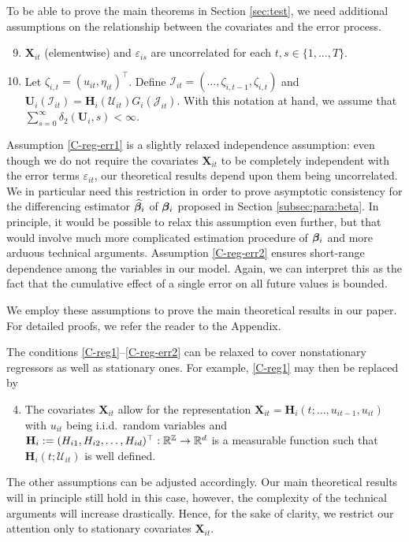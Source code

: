 \documentclass[a4paper,12pt]{article}
\begin{document}
To be able to prove the main theorems in Section \ref{sec:test}, we need additional assumptions on the relationship between the covariates and the error process.

\begin{enumerate}[label=(C\arabic*),leftmargin=1.05cm]
\setcounter{enumi}{8}
\item \label{C-reg-err1} $\mathbf{X}_{it}$ (elementwise) and $\varepsilon_{is}$ are uncorrelated for each $t, s\in \{1, \ldots, T\}$.
\item \label{C-reg-err2} Let $\zeta_{i, t} = (u_{it}, \eta_{it})^\top$. Define $\mathcal{I}_{it} = (\ldots, \zeta_{i, t-1}, \zeta_{i, t})$ and $\mathbf{U}_i(\mathcal{I}_{it}) =  \mathbf{H}_i(\mathcal{U}_{it})G_i(\mathcal{J}_{it})$. With this notation at hand, we assume that $\sum_{s=0}^\infty \delta_2(\mathbf{U}_i, s)<\infty$.

\end{enumerate}
Assumption \ref{C-reg-err1} is a slightly relaxed independence assumption: even though we do not require the covariates $\mathbf{X}_{it}$ to be completely independent with the error terms $\varepsilon_{it}$, our theoretical results depend upon them being uncorrelated. We in particular need this restriction in order to prove asymptotic consistency for the differencing estimator $\widehat{\bm{\beta}}_i$ of $\bm{\beta}_i$ proposed in Section \ref{subsec:para:beta}. In principle, it would be possible to relax this assumption even further, but that would involve much more complicated estimation procedure of $\bm{\beta}_i$ and more arduous technical arguments. Assumption \ref{C-reg-err2} ensures short-range dependence among the variables in our model. Again, we can interpret this as the fact that the cumulative effect of a single error on all future values is bounded.

We employ these assumptions to prove the main theoretical results in our paper. For detailed proofs, we refer the reader to the Appendix.

\begin{remark}
The conditions \ref{C-reg1}--\ref{C-reg-err2} can be relaxed to cover nonstationary regressors as well as stationary ones. For example, \ref{C-reg1} may then be replaced by
\begin{enumerate}[label=(C\arabic*$^\ast$),leftmargin=1.05cm]
\setcounter{enumi}{3}
\item \label{C-reg1-star} The covariates $ \mathbf{X}_{it}$ allow for the representation $ \mathbf{X}_{it} = \mathbf{H}_i(t; \ldots,u_{it-1},u_{it})$ with $u_{it}$ being i.i.d.\ random variables and $\mathbf{H}_i := (H_{i1}, H_{i2}, \ldots, H_{id})^\top: \mathbb{R}^{\mathbb{Z}} \rightarrow \mathbb{R}^d$ is a measurable function such that $\mathbf{H}_i(t;\mathcal{U}_{it})$ is well defined. 
\end{enumerate} 
The other assumptions can be adjusted accordingly. Our main theoretical results will in principle still hold in this case, however, the complexity of the technical arguments will increase drastically. Hence, for the sake of clarity, we restrict our attention only to stationary  covariates $\mathbf{X}_{it}$. 
\end{remark}
\end{document}
